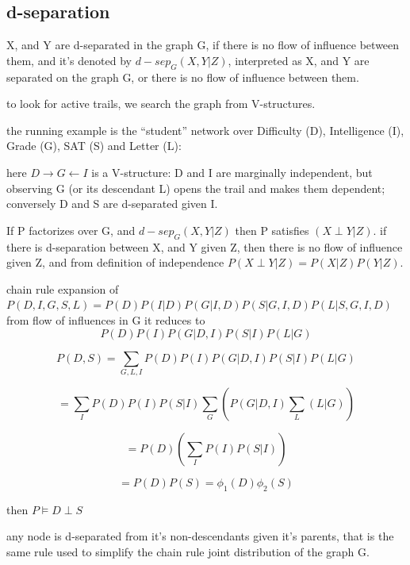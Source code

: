 \documentclass[4apaper,12pt]{book}
\begin{document}
\begin{description}
\begin{description}
\begin{description}
        \section{d-separation}
        \begin{description}
        \item X, and Y are d-separated in the graph G, if there is no flow of influence between them, and it's denoted by $d-sep_G(X,Y|Z)$, interpreted as X, and Y are separated on the graph G, or there is no flow of influence between them.
        \item to look for active trails, we search the graph from V-structures.
        \item the running example is the ``student'' network over Difficulty (D), Intelligence (I), Grade (G), SAT (S) and Letter (L):
        \item {}
        \item here $D\rightarrow G\leftarrow I$ is a V-structure: D and I are marginally independent, but observing G (or its descendant L) opens the trail and makes them dependent; conversely D and S are d-separated given I.
        \item If P factorizes over G, and $d-sep_G(X,Y|Z)$ then P satisfies $(X \perp Y|Z)$. if there is d-separation between X, and Y given Z, then there is no flow of influence given Z, and from definition of independence $P(X \perp Y | Z) = P(X|Z)P(Y|Z)$.
        \item chain rule expansion of $P(D,I,G,S,L)=P(D)P(I|D)P(G|I,D)P(S|G,I,D)P(L|S,G,I,D)$ from flow of influences in G it reduces to $$P(D)P(I)P(G|D,I)P(S|I)P(L|G)$$
        \item $$P(D,S)=\sum_{G,L,I}P(D)P(I)P(G|D,I)P(S|I)P(L|G)$$
        \item $$=\sum_{I}P(D)P(I)P(S|I)\sum_{G}(P(G|D,I)\sum_{L}(L|G))$$
        \item $$=P(D)(\sum_IP(I)P(S|I))$$
        \item $$=P(D)P(S)=\phi_1(D)\phi_2(S)$$
        \item then $P \models D \perp S$
        \item any node is d-separated from it's non-descendants given it's parents, that is the same rule used to simplify the chain rule joint distribution of the graph G.

\end{description}
\end{description}
\end{description}
\end{description}
\end{document}
